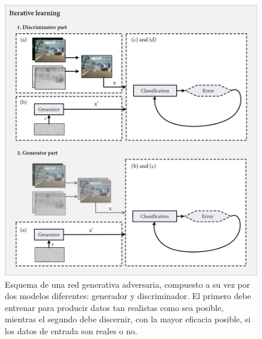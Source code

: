 \begin{figure}
    \centering
    \includegraphics[width=\linewidth]{figs/conclusions/gan.png}
    \caption{Esquema de una red generativa adversaria, compuesto a su vez por dos modelos diferentes: generador y discriminador. El primero debe entrenar para producir datos tan realistas como sea posible, mientras el segundo debe discernir, con la mayor eficacia posible, si los datos de entrada son reales o no.}
    \label{fig:conclusions_gan}
\end{figure}